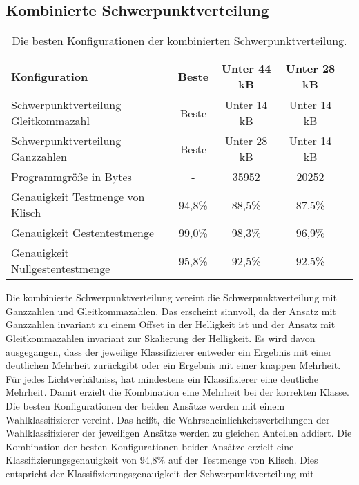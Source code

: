 \subsection{Kombinierte Schwerpunktverteilung}
\begin{table}[h!]
    \centering
    \begin{tabular}{ | l | c | c | c | c |}
        \hline
        Konfiguration & Beste & Unter 44 kB & Unter 28 kB \\\hline
        Schwerpunktverteilung Gleitkommazahl & Beste & Unter 14 kB & Unter 14 kB \\\hline
        Schwerpunktverteilung Ganzzahlen & Beste &  Unter 28 kB & Unter 14 kB \\\hline
        Programmgröße in Bytes & - & 35952 & 20252 \\\hline
        Genauigkeit Testmenge von Klisch & 94,8\% & 88,5\% & 87,5\% \\\hline
        Genauigkeit Gestentestmenge & 99,0\% & 98,3\% & 96,9\% \\\hline
        Genauigkeit Nullgestentestmenge & 95,8\% & 92,5\% & 92,5\% \\\hline
    \end{tabular}
    \caption{Die besten Konfigurationen der kombinierten Schwerpunktverteilung.}
    \label{tab:schwerpunktverteilung_int_and_float}
\end{table}
Die kombinierte Schwerpunktverteilung vereint die Schwerpunktverteilung mit Ganzzahlen und Gleitkommazahlen. Das erscheint sinnvoll, da der Ansatz mit Ganzzahlen invariant zu einem Offset in der
Helligkeit ist und der Ansatz mit Gleitkommazahlen invariant zur Skalierung der Helligkeit.
\newline
\newline
Es wird davon ausgegangen, dass der jeweilige Klassifizierer entweder ein Ergebnis mit einer deutlichen Mehrheit zurückgibt oder ein Ergebnis mit einer knappen Mehrheit. Für jedes Lichtverhältniss, hat mindestens ein
Klassifizierer eine deutliche Mehrheit. Damit erzielt die Kombination eine Mehrheit bei der korrekten Klasse. Die besten Konfigurationen der beiden Ansätze werden mit einem Wahlklassifizierer vereint.
Das heißt, die Wahrscheinlichkeitsverteilungen der Wahlklassifizierer der jeweiligen Ansätze werden zu gleichen Anteilen addiert.
\newline
\newline
Die Kombination der besten Konfigurationen beider Ansätze erzielt eine Klassifizierungsgenauigkeit von 94,8\% auf der Testmenge von Klisch. Dies entspricht der Klassifizierungsgenauigkeit der Schwerpunktverteilung mit
